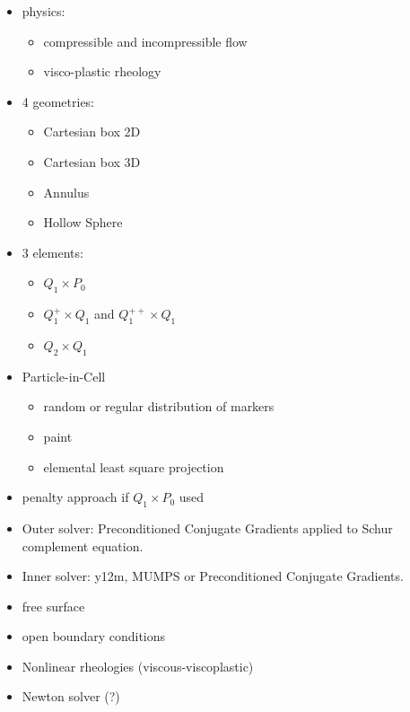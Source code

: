 \documentclass[a4paper,12pt]{article}
\begin{document}
\begin{itemize}
\item physics:
\begin{itemize}
\item compressible and incompressible flow
\item visco-plastic rheology
\end{itemize}
\item 4 geometries:
\begin{itemize}
\item Cartesian box 2D
\item Cartesian box 3D
\item Annulus
\item Hollow Sphere
\end{itemize}
\item 3 elements:
\begin{itemize}
\item $Q_1\times P_0$
\item $Q_1^+\times Q_1$ and $Q_1^{++}\times Q_1$
\item $Q_2\times Q_1$
\end{itemize}
\item Particle-in-Cell
\begin{itemize}
\item random or regular distribution of markers
\item paint  
\item elemental least square projection
\end{itemize}
\item penalty approach if $Q_1\times P_0$ used
\item Outer solver: Preconditioned Conjugate Gradients applied to Schur complement equation.
\item Inner solver: y12m, MUMPS or Preconditioned Conjugate Gradients.
\item free surface
\item open boundary conditions
\item Nonlinear rheologies (viscous-viscoplastic)
\item Newton solver (?)
\end{itemize}
\end{document}

